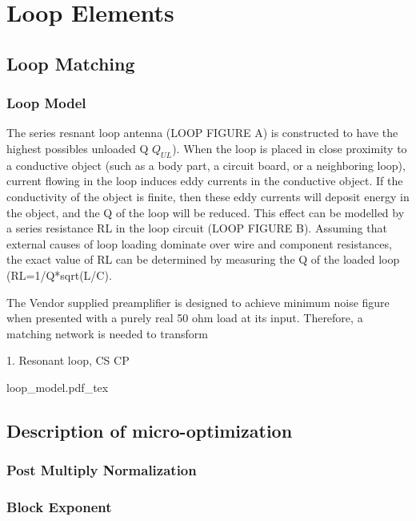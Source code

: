 \chapter{Loop Elements}

\section{Loop Matching}
\subsection{Loop Model}

The series resnant loop antenna (LOOP FIGURE A) is constructed to have the highest possibles unloaded Q $Q_{UL}$). When the loop is placed in close proximity to a conductive object (such as a body part, a circuit board, or a neighboring loop), current flowing in the loop induces eddy currents in the conductive object. If the conductivity of the object is finite, then these eddy currents will deposit energy in the object, and the Q of the loop will be reduced.  This effect can be modelled by a series resistance RL in the loop circuit (LOOP FIGURE B). Assuming that external causes of loop loading dominate over wire and component resistances, the exact value of RL can be determined by measuring the Q of the loaded loop (RL=1/Q*sqrt(L/C).

The Vendor supplied preamplifier is designed to achieve minimum noise figure when presented with a purely real 50 ohm load at its input. Therefore, a matching network is needed to transform 

1. Resonant loop, CS CP

{loop_model.pdf_tex}

\section{Description of micro-optimization}\label{ch1:opts}
\subsection{Post Multiply Normalization}
%
\subsection{Block Exponent}

